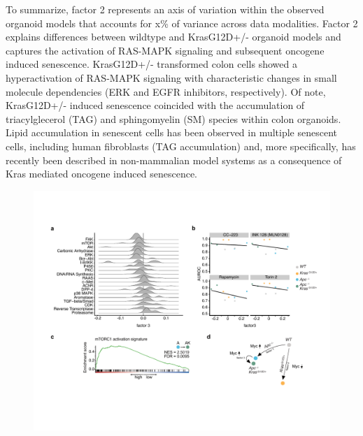 \begin{flushleft}
To summarize, factor 2 represents an axis of variation within the observed organoid models that accounts for x\% of variance across data modalities.  
Factor 2 explains differences between wildtype and KrasG12D+/- organoid models and captures the activation of RAS-MAPK signaling and subsequent oncogene induced senescence. KrasG12D+/- transformed colon cells showed a hyperactivation of RAS-MAPK signaling with characteristic changes in small molecule dependencies (ERK and EGFR inhibitors, respectively). Of note, KrasG12D+/- induced senescence coincided with the accumulation of triacylglecerol (TAG) and sphingomyelin (SM) species within colon organoids. Lipid accumulation in senescent cells has been observed in multiple senescent cells, including human fibroblasts (TAG accumulation) and, more specifically, has recently been described in non-mammalian model systems as a consequence of Kras mediated oncogene induced senescence. 



\begin{figure}[h]
\centering
\includegraphics[width=\textwidth,
                height=\textheight,
                keepaspectratio]{figures/adenomaprofiling/pdf/fig_4_1.pdf}
\caption{}
\label{fig_180}
\end{figure}
\bigbreak


\end{flushleft}
